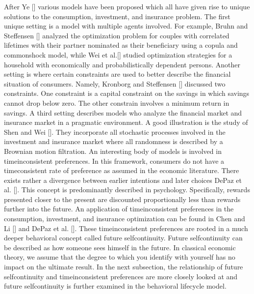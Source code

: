 \documentclass[letterpaper,10pt,english]{jupyterBook}
\begin{document}
\sphinxAtStartPar
After Ye {[}{]} various models have been proposed which all have given rise to unique solutions to the consumption, investment, and insurance problem. The first unique setting is a model with multiple agents involved. For example,  Bruhn and Steffensen {[}{]} analyzed the optimization problem for couples with correlated lifetimes with their partner nominated as their beneficiary using a copula and common\sphinxhyphen{}shock model, while Wei et al.{[}{]} studied optimization strategies for a household with economically and probabilistically dependent persons. Another setting is where certain constraints are used to better describe the financial situation of consumers. Namely, Kronborg and Steffensen {[}{]} discussed two constraints. One constraint is a capital constraint on the savings in which savings cannot drop below zero. The other constrain involves a minimum return in savings. A third setting describes models who analyze the financial market and insurance market in a pragmatic environment. A good illustration is the study of Shen and Wei {[}{]}. They incorporate all stochastic processes involved in the investment and insurance market where all randomness is described by a Brownian motion filtration. An interesting body of models is involved in time\sphinxhyphen{}inconsistent preferences. In this framework, consumers do not have a time\sphinxhyphen{}consistent rate of preference as assumed in the economic literature. There exists rather a divergence between earlier intentions and later choices De\sphinxhyphen{}Paz et al. {[}{]}. This concept is predominantly described in psychology. Specifically, rewards presented closer to the present are discounted proportionally less than rewards further into the future. An application of time\sphinxhyphen{}inconsistent preferences in the consumption, investment, and insurance optimization can be found in Chen and Li {[}{]} and De\sphinxhyphen{}Paz et al. {[}{]}. These time\sphinxhyphen{}inconsistent preferences are rooted in a much deeper behavioral concept called future self\sphinxhyphen{}continuity. Future self\sphinxhyphen{}continuity can be described as how someone sees himself in the future. In classical economic theory, we assume that the degree to which you identify with yourself has no impact on the ultimate result. In the next subsection, the relationship of future self\sphinxhyphen{}continuity and time\sphinxhyphen{}inconsistent preferences are more closely looked at and future self\sphinxhyphen{}continuity is further examined in the behavioral life\sphinxhyphen{}cycle model.
\end{document}
